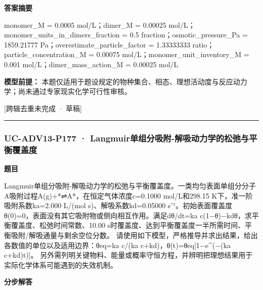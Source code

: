 \documentclass[UTF8,11pt,a4paper]{ctexart}
\begin{document}
\noindent\textbf{答案摘要}\par
monomer\_M = 0.0005 mol/L；dimer\_M = 0.00025 mol/L；monomer\_units\_in\_dimers\_fraction = 0.5 fraction；osmotic\_pressure\_Pa = 1859.21777 Pa；overestimate\_particle\_factor = 1.33333333 ratio；particle\_concentration\_M = 0.00075 mol/L；monomer\_unit\_inventory\_M = 0.001 mol/L；dimer\_mass\_action\_M = 0.00025 mol/L\par
\noindent\textbf{模型前提：}
本题仅适用于题设规定的物种集合、相态、理想活动度与反应动力学；尚未通过专家现实化学可行性审核。\par
\noindent\textcolor{red!65!black}{[跨辑去重未完成 · 草稿]} \par
\medskip\hrule\medskip
{}
\subsubsection*{UC-ADV13-P177 · Langmuir单组分吸附-解吸动力学的松弛与平衡覆盖度}
\noindent\textbf{题目}\par
Langmuir单组分吸附-解吸动力学的松弛与平衡覆盖度。一类均匀表面单组分分子A吸附过程A(g)+*⇌A*，在恒定气体浓度c=0.1000 mol/L和298.15 K下，准一阶吸附系数ka=2.000 L/(mol s)、解吸系数kd=0.05000 s⁻¹。初始表面覆盖度θ(0)=0，表面没有其它吸附物或侧向相互作用。满足dθ/dt=ka c(1−θ)−kdθ，求平衡覆盖度、松弛时间常数、10.00 s时覆盖度、达到平衡覆盖度一半所需时间、平衡吸附/解吸通量与剩余空位分数。 请使用如下模型，严格推导并求出结果，给出各数值的单位以及适用边界：θeq=ka c/(ka c+kd)，θ(t)=θeq[1−e\textasciicircum{}(−(ka c+kd)t)]。 另外需列明关键物料、能量或概率守恒方程，并辨明把理想结果用于实际化学体系可能遇到的失效机制。\par
\medskip\noindent\textbf{分步解答}
\end{document}
